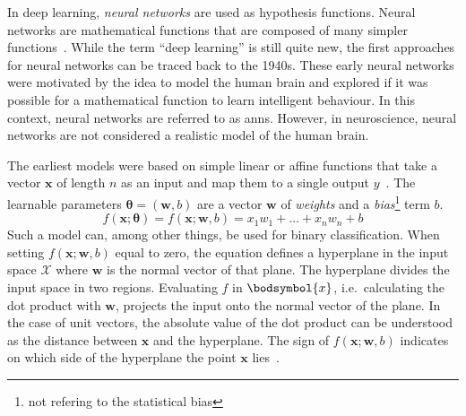 In deep learning, \textit{neural networks} are used as hypothesis functions.
Neural networks are mathematical functions that are composed of many simpler functions~\autocite{Goodfellow-et-al-2016}.
While the term \enquote{deep learning} is still quite new, the first approaches for neural networks can be traced back to the 1940s.
These early neural networks were motivated by the idea to model the human brain and explored if it was possible for a mathematical function to learn intelligent behaviour.
In this context, neural networks are referred to as \glspl{ann}.
However, in neuroscience, neural networks are not considered a realistic model of the human brain.

The earliest models were based on simple linear or affine functions that take a vector $\boldsymbol{x}$ of length $n$ as an input and map them to a single output $y$~\autocite{Goodfellow-et-al-2016}.
The learnable parameters $\boldsymbol{\theta} = (\boldsymbol{w}, b)$ are a vector $\boldsymbol{w}$ of \textit{weights} and a \textit{bias}\footnote{not refering to the statistical bias} term $b$.
\[
    f(\boldsymbol{x}; \boldsymbol{\theta}) = f(\boldsymbol{x}; \boldsymbol{w}, b) = x_1 w_1 + \dots + x_n w_n + b
\]
Such a model can, among other things, be used for binary classification.
When setting $f(\boldsymbol{x}; \boldsymbol{w}, b)$ equal to zero, the equation defines a hyperplane in the input space $\mathcal{X}$ where $\boldsymbol{w}$ is the normal vector of that plane.
The hyperplane divides the input space in two regions.
Evaluating $f$ in $\bodsymbol{x}$, i.e.\ calculating the dot product with $\boldsymbol{w}$, projects the input onto the normal vector of the plane.
In the case of unit vectors, the absolute value of the dot product can be understood as the distance between $\boldsymbol{x}$ and the hyperplane.
The sign of $f(\boldsymbol{x}; \boldsymbol{w}, b)$ indicates on which side of the hyperplane the point $\boldsymbol{x}$ lies~\autocite{bishop2006}.

